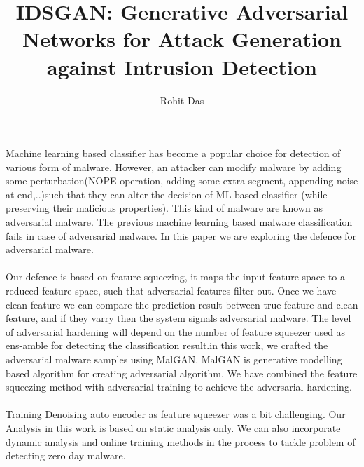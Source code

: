 \documentclass[11pt,english]{article}
\author{
  Rohit Das
}
\begin{document}
\title{ IDSGAN: Generative Adversarial Networks for Attack Generation against Intrusion Detection }
\maketitle


   Machine learning based classifier has become a popular choice for detection of various form of malware. However, an attacker can modify malware by adding some perturbation(NOPE operation, adding some extra segment, appending noise at end,..)such that they can alter the decision of ML-based classifier (while preserving their malicious properties). This kind of malware are known as adversarial malware. The previous machine learning based malware classification fails in case of adversarial malware. In this paper we are exploring the defence for adversarial malware.
   \\
   \\
   Our defence is based on feature squeezing, it maps the input feature space to a reduced feature space, such that adversarial features filter out. Once we have clean feature we can compare the prediction result between true feature and clean feature, and if they varry then the system signals adversarial malware. The level of adversarial hardening will depend on the number of feature squeezer used as ens-amble for detecting the classification result.in this work, we crafted  the adversarial malware samples using MalGAN. MalGAN is generative modelling based algorithm for creating adversarial algorithm. We have combined the feature squeezing method with adversarial training to achieve the adversarial hardening. 
\\
\\
Training Denoising auto encoder as feature squeezer was a bit challenging. Our Analysis in this work is based on   static analysis only. We can also incorporate dynamic analysis and online training methods in the process to tackle problem of detecting zero day malware.
\end{document}
